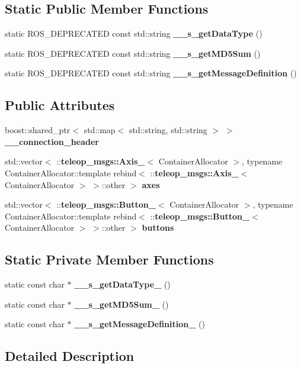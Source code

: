 \subsection*{Static Public Member Functions}
\begin{DoxyCompactItemize}
\item 
static ROS\_\-DEPRECATED const std::string {\bf \_\-\_\-s\_\-getDataType} ()
\item 
static ROS\_\-DEPRECATED const std::string {\bf \_\-\_\-s\_\-getMD5Sum} ()
\item 
static ROS\_\-DEPRECATED const std::string {\bf \_\-\_\-s\_\-getMessageDefinition} ()
\end{DoxyCompactItemize}
\subsection*{Public Attributes}
\begin{DoxyCompactItemize}
\item 
boost::shared\_\-ptr$<$ std::map$<$ std::string, std::string $>$ $>$ {\bf \_\-\_\-connection\_\-header}
\item 
std::vector$<$ ::{\bf teleop\_\-msgs::Axis\_\-}$<$ ContainerAllocator $>$, typename ContainerAllocator::template rebind$<$ ::{\bf teleop\_\-msgs::Axis\_\-}$<$ ContainerAllocator $>$ $>$::other $>$ {\bf axes}
\item 
std::vector$<$ ::{\bf teleop\_\-msgs::Button\_\-}$<$ ContainerAllocator $>$, typename ContainerAllocator::template rebind$<$ ::{\bf teleop\_\-msgs::Button\_\-}$<$ ContainerAllocator $>$ $>$::other $>$ {\bf buttons}
\end{DoxyCompactItemize}
\subsection*{Static Private Member Functions}
\begin{DoxyCompactItemize}
\item 
static const char $\ast$ {\bf \_\-\_\-s\_\-getDataType\_\-} ()
\item 
static const char $\ast$ {\bf \_\-\_\-s\_\-getMD5Sum\_\-} ()
\item 
static const char $\ast$ {\bf \_\-\_\-s\_\-getMessageDefinition\_\-} ()
\end{DoxyCompactItemize}


\subsection{Detailed Description}
